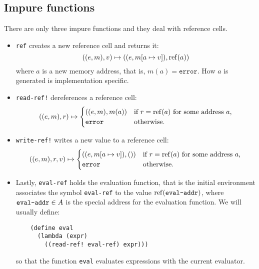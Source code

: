 \subsection{Impure functions}

There are only three impure functions and they deal with reference cells.
\begin{itemize}
\item \texttt{ref} creates a new reference cell and returns it:
  \[
    ((e,m), v) \mapsto ((e,m[a \mapsto v]), \mathrm{ref}(a))
  \]
  where $a$ is a new memory address, that is, $m(a) = \mathtt{error}$. How $a$
  is generated is implementation specific.
\item \texttt{read-ref!} dereferences a reference cell:
  \[
    ((e,m), r) \mapsto
    \begin{cases}
      ((e,m), m(a)) & \text{if $r = \mathrm{ref}(a)$ for some address $a$,}\\
      \mathtt{error} & \text{otherwise.}
    \end{cases}
  \]
\item \texttt{write-ref!} writes a new value to a reference cell:
  \[
    ((e,m), r, v) \mapsto
    \begin{cases}
      ((e,m[a \mapsto v]), ()) & \text{if $r = \mathrm{ref}(a)$ for some address $a$,}\\
      \mathtt{error} & \text{otherwise.}
    \end{cases}
  \]
\item Lastly, \texttt{eval-ref} holds the evaluation function, that is the
  initial environment associates the symbol \texttt{eval-ref} to the value
  $\mathrm{ref}(\text{\texttt{eval-addr}})$, where $\text{\texttt{eval-addr}} \in A$ is the special address for the
  evaluation function. We will usually define:
  \begin{lstlisting}
    (define eval
      (lambda (expr)
        ((read-ref! eval-ref) expr)))
  \end{lstlisting}
  so that the function \texttt{eval} evaluates expressions with the current evaluator.
\end{itemize}

